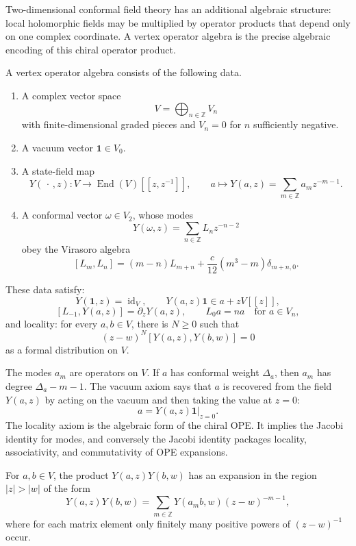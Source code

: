 Two-dimensional conformal field theory has an additional algebraic structure:
local holomorphic fields may be multiplied by operator products that depend
only on one complex coordinate.  A vertex operator algebra is the precise
algebraic encoding of this chiral operator product.

\begin{definition}
\label{def:vertex-operator-algebra}
A vertex operator algebra consists of the following data.
\begin{enumerate}
\item A complex vector space
\[
  V=\bigoplus_{n\in\mathbb Z}V_n
\]
with finite-dimensional graded pieces and \(V_n=0\) for \(n\) sufficiently
negative.
\item A vacuum vector \(\mathbf 1\in V_0\).
\item A state-field map
\[
  Y(\,\cdot\,,z):V\longrightarrow \operatorname{End}(V)[[z,z^{-1}]],
  \qquad
  a\longmapsto Y(a,z)=\sum_{m\in\mathbb Z}a_m z^{-m-1}.
\]
\item A conformal vector \(\omega\in V_2\), whose modes
\[
  Y(\omega,z)=\sum_{n\in\mathbb Z}L_n z^{-n-2}
\]
obey the Virasoro algebra
\[
  [L_m,L_n]=(m-n)L_{m+n}
  +\frac{c}{12}(m^3-m)\delta_{m+n,0}.
\]
\end{enumerate}
These data satisfy:
\[
  Y(\mathbf 1,z)=\operatorname{id}_V,\qquad
  Y(a,z)\mathbf 1\in a+zV[[z]],
\]
\[
  [L_{-1},Y(a,z)]=\partial_zY(a,z),
  \qquad
  L_0a=na\quad\text{for }a\in V_n,
\]
and locality:
for every \(a,b\in V\), there is \(N\ge0\) such that
\[
  (z-w)^N [Y(a,z),Y(b,w)]=0
\]
as a formal distribution on \(V\).
\end{definition}

The modes \(a_m\) are operators on \(V\).  If \(a\) has conformal weight
\(\Delta_a\), then \(a_m\) has degree \(\Delta_a-m-1\).  The vacuum axiom says
that \(a\) is recovered from the field \(Y(a,z)\) by acting on the vacuum and
then taking the value at \(z=0\):
\[
  a=\left. Y(a,z)\mathbf 1\right|_{z=0}.
\]
The locality axiom is the algebraic form of the chiral OPE.  It implies the
Jacobi identity for modes, and conversely the Jacobi identity packages
locality, associativity, and commutativity of OPE expansions.

\begin{proposition}
\label{prop:voa-ope-from-locality}
For \(a,b\in V\), the product \(Y(a,z)Y(b,w)\) has an expansion in the region
\(|z|>|w|\) of the form
\[
  Y(a,z)Y(b,w)
  =
  \sum_{m\in\mathbb Z}Y(a_m b,w)(z-w)^{-m-1},
\]
where for each matrix element only finitely many positive powers of
\((z-w)^{-1}\) occur.
\end{proposition}

